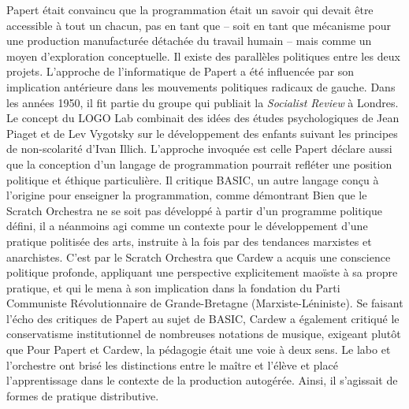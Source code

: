 {Papert \'etait convaincu que la programmation \'etait un savoir qui
devait \^etre accessible \`a tout un chacun, pas en tant que
 {--} soit en tant que m\'ecanisme pour une production
manufactur\'ee d\'etach\'ee du travail humain {--} mais comme un moyen
d'exploration conceptuelle. Il existe des parall\`eles politiques entre
les deux projets. L'approche de l'informatique de Papert a \'et\'e
influenc\'ee par son implication ant\'erieure dans les mouvements
politiques radicaux de gauche. Dans les ann\'ees 1950, il fit partie du
groupe qui publiait la {\em Socialist Review} \`a Londres. Le
concept du LOGO Lab combinait des id\'ees des \'etudes psychologiques
de Jean Piaget et de Lev Vygotsky sur le d\'eveloppement des enfants
suivant les principes de non{}-scolarit\'e d'Ivan Illich. L'approche
invoqu\'ee est celle  Papert d\'eclare
aussi que la conception d'un langage de programmation pourrait
refl\'eter une position politique et \'ethique particuli\`ere. Il
critique BASIC, un autre langage con\c{c}u \`a l'origine pour enseigner
la programmation, comme d\'emontrant  Bien que le Scratch Orchestra ne se
soit pas d\'evelopp\'e \`a partir d'un programme politique d\'efini, il
a n\'eanmoins agi comme un contexte pour le d\'eveloppement d'une
pratique politis\'ee des arts, instruite \`a la fois par des tendances
marxistes et anarchistes. C'est par le Scratch Orchestra que Cardew a
acquis une conscience politique profonde, appliquant une perspective
explicitement mao\"iste \`a sa propre pratique, et qui le mena \`a son
implication dans la fondation du Parti Communiste R\'evolutionnaire de
Grande{}-Bretagne (Marxiste{}-L\'eniniste). Se faisant l'\'echo des
critiques de Papert au sujet de BASIC, Cardew a \'egalement critiqu\'e
le conservatisme institutionnel de nombreuses notations de musique,
exigeant plut\^ot que  Pour Papert et Cardew, la p\'edagogie
\'etait une voie \`a deux sens. Le labo et l'orchestre ont bris\'e les
distinctions entre le ma\^itre et l'\'el\`eve et plac\'e
l'apprentissage dans le contexte de la production autog\'er\'ee. Ainsi,
il s'agissait de formes de pratique distributive.


}
